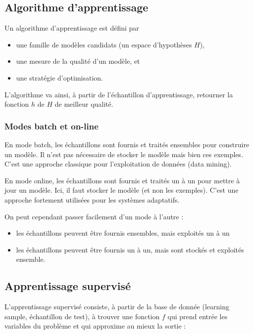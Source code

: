 		
		
		\subsection{Algorithme d'apprentissage}
		
		Un algorithme d'apprentissage est défini par

		\begin{itemize}
			\item une famille de modèles candidats (un espace d'hypothèses $H$),
			\item une mesure de la qualité d'un modèle, et
			\item une stratégie d'optimisation.
		\end{itemize}

		L'algorithme va ainsi, à partir de l'échantillon d'apprentissage, retourner la fonction $h$ de $H$ de meilleur qualité.
					
			\subsubsection{Modes batch et on-line}
		
			En mode batch, les échantillons sont fournis et traités ensembles pour construire un modèle. Il n'est pas nécessaire de stocker le modèle mais bien ces exemples. C'est une approche classique pour l'exploitation de données (data mining).
			
		En mode online, les échantillons sont fournis et traités un à un pour mettre à jour un modèle. Ici, il faut stocker le modèle (et non les exemples). C'est une approche fortement utilisées pour les systèmes adaptatifs.
		
			On peut cependant passer facilement d'un mode à l'autre :
		
			\begin{itemize}
				\item les échantillons peuvent être fournis ensembles, mais exploités un à un
				\item les échantillons peuvent être fournis un à un, mais sont stockés et exploités ensemble.
			\end{itemize}
		
		\subsection{Apprentissage supervisé}
		
		L'apprentissage supervisé consiste, à partir de la base de donnée (learning sample, échantillon de test), à trouver une fonction $f$ qui prend entrée les variables du problème et qui approxime au mieux la sortie :

